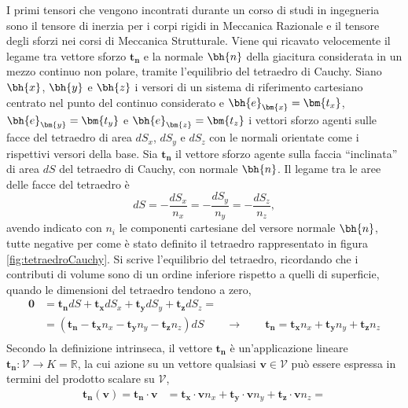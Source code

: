 \begin{example}
 I primi tensori che vengono incontrati durante un corso di studi in ingegneria sono il tensore di inerzia per i corpi rigidi in Meccanica Razionale e il tensore degli sforzi nei corsi di Meccanica Strutturale.  
Viene qui ricavato velocemente il legame tra vettore sforzo $\bm{t_n}$ e la normale $\bh{n}$ della giacitura considerata in un mezzo continuo non polare, tramite l'equilibrio del tetraedro di Cauchy. Siano $\bh{x}$, $\bh{y}$ e $\bh{z}$ i versori di un sistema di riferimento cartesiano centrato nel punto del continuo considerato e $\bh{e}_{\bm{x}} = \bm{t_x}$, $\bh{e}_{\bm{y}} = \bm{t_y}$ e $\bh{e}_{\bm{z}} = \bm{t_z}$ i vettori sforzo agenti sulle facce del tetraedro di area $dS_x$, $dS_y$ e $dS_z$ con le normali orientate come i rispettivi versori della base. Sia $\bm{t_n}$ il vettore sforzo agente sulla faccia ``inclinata'' di area $dS$ del tetraedro di Cauchy, con normale $\bh{n}$. Il legame tra le aree delle facce del tetraedro è
\begin{equation}
 dS = - \dfrac{dS_x}{n_x} = - \dfrac{dS_y}{n_y} = - \dfrac{dS_z}{n_z} ,
\end{equation}
avendo indicato con $n_i$ le componenti cartesiane del versore normale $\bh{n}$, tutte negative per come è stato definito il tetraedro rappresentato in figura \ref{fig:tetraedroCauchy}. Si scrive l'equilibrio del tetraedro, ricordando che i contributi di volume sono di un ordine inferiore rispetto a quelli di superficie, quando le dimensioni del tetraedro tendono a zero,
\begin{equation}
\begin{aligned}
 \bm{0} & = \bm{t_n} dS + \bm{t_x} dS_x + \bm{t_y} dS_y + \bm{t_z} dS_z = \\
  & = ( \bm{t_n} - \bm{t_x} n_x - \bm{t_y} n_y - \bm{t_z} n_z ) dS  \qquad \rightarrow \qquad \bm{t_n} = \bm{t_x} n_x + \bm{t_y} n_y + \bm{t_z} n_z \\
\end{aligned}
\end{equation}
Secondo la definizione intrinseca, il vettore $\bm{t_n}$ è un'applicazione lineare $\bm{t_n}: \mathcal{V} \rightarrow K = \mathbb{R}$, la cui azione su un vettore qualsiasi $\bm{v} \in \mathcal{V}$ può essere espressa in termini del prodotto scalare su $\mathcal{V}$,
\begin{equation}
\begin{aligned}
\bm{t_n}(\bm{v}) = \bm{t_n} \cdot \bm{v} & = \bm{t_x}\cdot \bm{v} n_x + \bm{t_y}\cdot \bm{v} n_y + \bm{t_z}\cdot \bm{v} n_z = \\

\end{aligned}
\end{equation}
\end{example}
